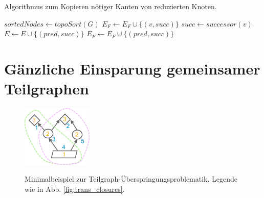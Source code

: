 \begin{algorithm}
	\caption{Algorithmus zum Kopieren nötiger Kanten von reduzierten Knoten.}\label{lst:reduce}
	\begin{algorithmic}[1]
		 
			\State $sortedNodes \gets topoSort(G)$
							\State $E_F \gets E_F \cup \{(v, succ)\}$ 
						\EndIf
					\EndFor
				\Else {}
					\State $succ \gets successor(v)$ 
							\State $E \gets E \cup \{(pred, succ)\}$
							\State $E_F \gets E_F \cup \{(pred, succ)\}$ 
						\EndIf
					\EndFor
				\EndIf
			\EndFor\label{euclidendwhile}
		\EndProcedure
	\end{algorithmic}
\end{algorithm}

\pagebreak %

\section{Gänzliche Einsparung gemeinsamer Teilgraphen} \label{sec:skip_entirely}

\begin{figure}
	\centering
	\vspace{-30pt} %
	\includegraphics[width=0.30\textwidth]{Bilder/problem_illustration.pdf}
	\vspace{-10pt}
	\caption[Minimalbeispiel zur Teilgraph-Überspringungs-Problematik. Legende wie in \autoref{fig:trans_closures}.]{\unskip}
	Minimalbeispiel zur Teilgraph-Überspringungsproblematik. Legende wie in Abb. \ref{fig:trans_closures}.
	\label{fig:prob_illu}
\end{figure}

